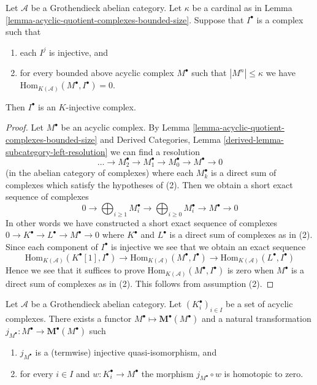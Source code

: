 \begin{lemma}
\label{lemma-characterize-K-injective}
Let $\mathcal{A}$ be a Grothendieck abelian category.
Let $\kappa$ be a cardinal as in
Lemma \ref{lemma-acyclic-quotient-complexes-bounded-size}.
Suppose that $I^\bullet$ is a complex such that
\begin{enumerate}
\item each $I^j$ is injective, and
\item for every bounded above acyclic complex $M^\bullet$
such that $|M^n| \leq \kappa$
we have $\text{Hom}_{K(\mathcal{A})}(M^\bullet, I^\bullet) = 0$.
\end{enumerate}
Then $I^\bullet$ is an $K$-injective complex.
\end{lemma}

\begin{proof}
Let $M^\bullet$ be an acyclic complex. By
Lemma \ref{lemma-acyclic-quotient-complexes-bounded-size}
and Derived Categories, Lemma \ref{derived-lemma-subcategory-left-resolution}
we can find a resolution
$$
\ldots \to M_2^\bullet \to M_1^\bullet \to M_0^\bullet \to M^\bullet \to 0
$$
(in the abelian category of complexes) where each $M_k^\bullet$ is a
direct sum of complexes which satisfy the hypotheses of (2).
Then we obtain a short exact sequence of complexes
$$
0 \to
\bigoplus\nolimits_{i \geq 1} M_i^\bullet \to
\bigoplus\nolimits_{i \geq 0} M_i^\bullet \to
M^\bullet \to 0
$$
In other words we have constructed a short exact sequence of complexes
$0 \to K^\bullet \to L^\bullet \to M^\bullet \to 0$ where $K^\bullet$
and $L^\bullet$ is a direct sum of complexes as in (2).
Since each component of $I^\bullet$ is injective we see that we obtain
an exact sequence
$$
\text{Hom}_{K(\mathcal{A})}(K^\bullet[1], I^\bullet) \to
\text{Hom}_{K(\mathcal{A})}(M^\bullet, I^\bullet) \to
\text{Hom}_{K(\mathcal{A})}(L^\bullet, I^\bullet)
$$
Hence we see that it suffices to prove
$\text{Hom}_{K(\mathcal{A})}(M^\bullet, I^\bullet)$ is zero
when $M^\bullet$ is a direct sum of complexes as in (2).
This follows from assumption (2).
\end{proof}

\begin{lemma}
\label{lemma-functorial-homotopies}
Let $\mathcal{A}$ be a Grothendieck abelian category.
Let $(K_i^\bullet)_{i \in I}$ be a set of acyclic complexes.
There exists a functor $M^\bullet \mapsto \mathbf{M}^\bullet(M^\bullet)$
and a natural transformation
$j_{M^\bullet} : M^\bullet \to \mathbf{M}^\bullet(M^\bullet)$
such
\begin{enumerate}
\item $j_{M^\bullet}$ is a (termwise) injective quasi-isomorphism, and
\item for every $i \in I$ and $w : K_i^\bullet \to M^\bullet$
the morphism $j_{M^\bullet} \circ w$ is homotopic to zero.
\end{enumerate}
\end{lemma}

